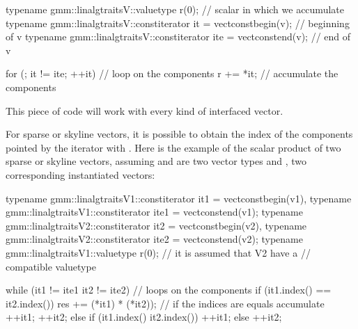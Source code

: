 \documentclass[a4paper,11pt,english]{sphinxmanual}
\begin{document}
\begin{sphinxVerbatim}[commandchars=\\\{\}]
typename gmm::linalg\PYGZus{}traits\PYGZlt{}V\PYGZgt{}::value\PYGZus{}type r(0); // scalar in which we accumulate
typename gmm::linalg\PYGZus{}traits\PYGZlt{}V\PYGZgt{}::const\PYGZus{}iterator it = vect\PYGZus{}const\PYGZus{}begin(v); // beginning of v
typename gmm::linalg\PYGZus{}traits\PYGZlt{}V\PYGZgt{}::const\PYGZus{}iterator ite = vect\PYGZus{}const\PYGZus{}end(v); // end of v

for (; it != ite; ++it)  // loop on the components
  r += *it;              // accumulate the components
\end{sphinxVerbatim}

This piece of code will work with every kind of interfaced vector.

For sparse or skyline vectors, it is possible to obtain the index of the components pointed by the iterator with . Here is the example of the scalar product of two sparse or skyline vectors, assuming  and  are two vector types and ,  two corresponding instantiated vectors:

\begin{sphinxVerbatim}[commandchars=\\\{\}]
typename gmm::linalg\PYGZus{}traits\PYGZlt{}V1\PYGZgt{}::const\PYGZus{}iterator it1 = vect\PYGZus{}const\PYGZus{}begin(v1),
typename gmm::linalg\PYGZus{}traits\PYGZlt{}V1\PYGZgt{}::const\PYGZus{}iterator ite1 = vect\PYGZus{}const\PYGZus{}end(v1);
typename gmm::linalg\PYGZus{}traits\PYGZlt{}V2\PYGZgt{}::const\PYGZus{}iterator it2 = vect\PYGZus{}const\PYGZus{}begin(v2),
typename gmm::linalg\PYGZus{}traits\PYGZlt{}V2\PYGZgt{}::const\PYGZus{}iterator ite2 = vect\PYGZus{}const\PYGZus{}end(v2);
typename gmm::linalg\PYGZus{}traits\PYGZlt{}V1\PYGZgt{}::value\PYGZus{}type r(0); // it is assumed that V2 have a
                                             // compatible value\PYGZus{}type

while (it1 != ite1 \PYGZam{}\PYGZam{} it2 != ite2) \PYGZob{}  // loops on the components
  if (it1.index() == it2.index()) \PYGZob{}
    res += (*it1) * (*it2));          // if the indices are equals accumulate
    ++it1;
    ++it2;
  \PYGZcb{}
  else if (it1.index() \PYGZlt{} it2.index())
    ++it1;
  else
    ++it2;
\PYGZcb{}
\end{sphinxVerbatim}
\end{document}
